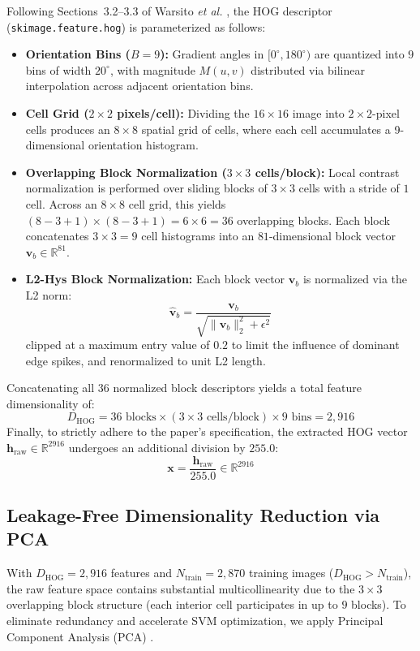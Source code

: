 \documentclass[conference]{IEEEtran}
\begin{document}
Following Sections~3.2--3.3 of Warsito \emph{et al.} \cite{warsito2026lightweight}, the HOG descriptor (\texttt{skimage.feature.hog}) is parameterized as follows:
\begin{itemize}
    \item \textbf{Orientation Bins ($B = 9$):} Gradient angles in $[0^\circ, 180^\circ)$ are quantized into $9$ bins of width $20^\circ$, with magnitude $M(u,v)$ distributed via bilinear interpolation across adjacent orientation bins.
    \item \textbf{Cell Grid ($2 \times 2$ pixels/cell):} Dividing the $16 \times 16$ image into $2 \times 2$-pixel cells produces an $8 \times 8$ spatial grid of cells, where each cell accumulates a 9-dimensional orientation histogram.
    \item \textbf{Overlapping Block Normalization ($3 \times 3$ cells/block):} Local contrast normalization is performed over sliding blocks of $3 \times 3$ cells with a stride of $1$ cell. Across an $8 \times 8$ cell grid, this yields $(8 - 3 + 1) \times (8 - 3 + 1) = 6 \times 6 = 36$ overlapping blocks. Each block concatenates $3 \times 3 = 9$ cell histograms into an $81$-dimensional block vector $\mathbf{v}_b \in \mathbb{R}^{81}$.
    \item \textbf{L2-Hys Block Normalization:} Each block vector $\mathbf{v}_b$ is normalized via the L2 norm:
    \begin{equation}
        \hat{\mathbf{v}}_b = \frac{\mathbf{v}_b}{\sqrt{\|\mathbf{v}_b\|_2^2 + \epsilon^2}}
    \end{equation}
    clipped at a maximum entry value of $0.2$ to limit the influence of dominant edge spikes, and renormalized to unit L2 length.
\end{itemize}

Concatenating all $36$ normalized block descriptors yields a total feature dimensionality of:
\begin{equation}
    D_{\text{HOG}} = 36 \text{ blocks} \times (3 \times 3 \text{ cells/block}) \times 9 \text{ bins} = 2,916
\end{equation}
Finally, to strictly adhere to the paper's specification, the extracted HOG vector $\mathbf{h}_{\text{raw}} \in \mathbb{R}^{2916}$ undergoes an additional division by $255.0$:
\begin{equation}
    \mathbf{x} = \frac{\mathbf{h}_{\text{raw}}}{255.0} \in \mathbb{R}^{2916}
    \label{eq:hog_div255}
\end{equation}

\subsection{Leakage-Free Dimensionality Reduction via PCA}
With $D_{\text{HOG}} = 2,916$ features and $N_{\text{train}} = 2,870$ training images ($D_{\text{HOG}} > N_{\text{train}}$), the raw feature space contains substantial multicollinearity due to the $3 \times 3$ overlapping block structure (each interior cell participates in up to $9$ blocks). To eliminate redundancy and accelerate SVM optimization, we apply Principal Component Analysis (PCA) \cite{jolliffe2016principal}.
\end{document}
